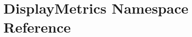\hypertarget{namespace_display_metrics}{}\section{Display\+Metrics Namespace Reference}
\label{namespace_display_metrics}
